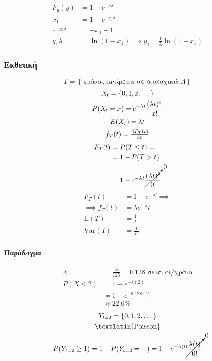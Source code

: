 \documentclass[11pt,a4paper,titlepage,draft]{article}
\begin{document}
\begin{align*}
F_y(y) &= 1-e^{-y\lambda }\\
x_1 &= 1-e^{-y_2\lambda } \\
e^{-y_1\lambda }&=-x_1+1\\
y_1\lambda &= \ln (1-x_1) \implies y_1 = \frac{1}{\lambda} \ln (1-x_1)
\end{align*}



\subsubsection{Εκθετική}
\[
T = \left\lbrace
\text{χρόνος ανάμεσα σε διαδοχικά \(A\)}
\right\rbrace
\]
\begin{gather*}
X_t = \left\lbrace 0,1,2,\dots \right\rbrace\\
P(X_t=x) = e^{-\lambda t} \frac{(\lambda t)^x}{x!} \\
E(X_t)=\lambda t\\
f_T(t) = \od{F_T(t)}{t}
\end{gather*}
\begin{align*}
F_T(t) &= P(T \leq t) =
\\ &=
1-P(T>t)
\\ &=
1-e^{-\lambda t}\cancelto{0}{\frac{(\lambda t)^0}{0!}}
\end{align*}
\begin{align*}
F_T(t) &= 1-e^{-\lambda t} \implies \\
\implies f_T(t) &= \lambda e^{-\lambda}t\\
\mathrm E(T) &= \frac{1}{\lambda }\\
\mathrm{Var}(T) &= \frac{1}{\lambda ^2}
\end{align*}

\paragraph{Παράδειγμα}
\begin{align*}
\lambda &= \frac{16}{125} = 0.128 \text{ σεισμοί/χρόνο} \\
P(X \leq 2) &= 1-e^{-\lambda (2)} \\
&= 1-e^{-0.128 (2)} \\
&\approx 22.6\%
\end{align*}
\begin{gather*}
Y_{t=2} = \left\lbrace 0,1,2,\dots \right\rbrace\\
\text{\textlatin{Poisson}} \\
P(Y_{t=2} \geq 1) = 1 - P(Y_{t=2} = -) = 1 - e^{-\lambda (t)} \cancelto{0}{\frac{\lambda (t)}{0!}}
\end{gather*}
\end{document}
